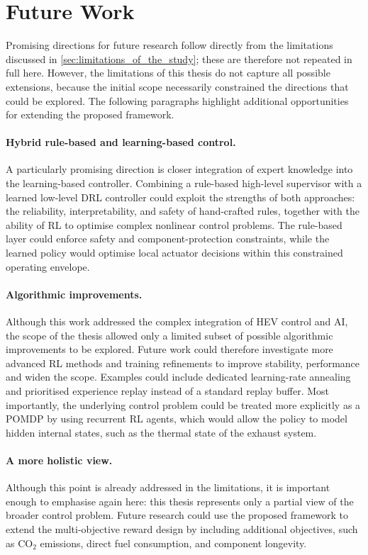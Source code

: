 \section{Future Work}
Promising directions for future research follow directly from the limitations discussed in \autoref{sec:limitations_of_the_study}; these are therefore not repeated in full here. However, the limitations of this thesis do not capture all possible extensions, because the initial scope necessarily constrained the directions that could be explored. The following paragraphs highlight additional opportunities for extending the proposed framework.

\paragraph{Hybrid rule-based and learning-based control.}
A particularly promising direction is closer integration of expert knowledge into the learning-based controller. Combining a rule-based high-level supervisor with a learned low-level \ac{DRL} controller could exploit the strengths of both approaches: the reliability, interpretability, and safety of hand-crafted rules, together with the ability of \ac{RL} to optimise complex nonlinear control problems. The rule-based layer could enforce safety and component-protection constraints, while the learned policy would optimise local actuator decisions within this constrained operating envelope.

\paragraph{Algorithmic improvements.}
Although this work addressed the complex integration of \ac{HEV} control and \ac{AI}, the scope of the thesis allowed only a limited subset of possible algorithmic improvements to be explored. Future work could therefore investigate more advanced \ac{RL} methods and training refinements to improve stability, performance and widen the scope. Examples could include dedicated learning-rate annealing and prioritised experience replay instead of a standard replay buffer. Most importantly, the underlying control problem could be treated more explicitly as a \ac{POMDP} by using recurrent \ac{RL} agents, which would allow the policy to model hidden internal states, such as the thermal state of the exhaust system.

\paragraph{A more holistic view.}
Although this point is already addressed in the limitations, it is important enough to emphasise again here: this thesis represents only a partial view of the broader control problem. Future research could use the proposed framework to extend the multi-objective reward design by including additional objectives, such as \(\mathrm{CO}_2\) emissions, direct fuel consumption, and component longevity.

